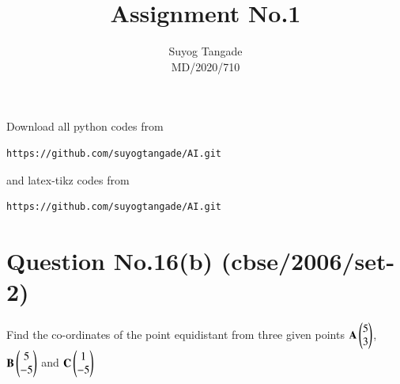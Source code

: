 \documentclass[journal,12pt,twocolumn]{IEEEtran}
\begin{document}
\def\rightbox#1{\makebox[0in][r]{#1}}
\def\centbox#1{\makebox[0in]{#1}}
\def\topbox#1{\raisebox{-\baselineskip}[0in][0in]{#1}}
\def\midbox#1{\raisebox{-0.5\baselineskip}[0in][0in]{#1}}
\vspace{3cm}
\title{Assignment No.1} 
\author{Suyog Tangade\\MD/2020/710} 
\maketitle
\newpage
\bigskip
\renewcommand{\thefigure}{\theenumi}
\renewcommand{\thetable}{\theenumi}
Download all python codes from
\begin{lstlisting}
https://github.com/suyogtangade/AI.git
\end{lstlisting}
%
and latex-tikz codes from
%
\begin{lstlisting}
https://github.com/suyogtangade/AI.git
\end{lstlisting}
%
\section{Question No.16(b) (cbse/2006/set-2)}

Find the co-ordinates of the point equidistant from three given points $\mathbf{A}\begin{pmatrix}5\\3\end{pmatrix}$, $\mathbf{B}\begin{pmatrix}5\\-5\end{pmatrix}$ and $\mathbf{C}\begin{pmatrix}1\\-5\end{pmatrix}$ 
\solution
\end{document}
